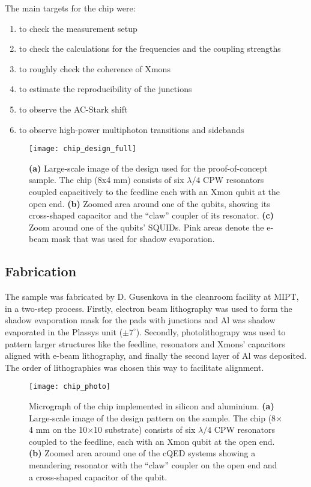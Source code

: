 \documentclass[12pt, twoside]{report}
\numberwithin{equation}{section}
\begin{document}
The main targets for the chip were:
\begin{enumerate}[label=(\alph*), leftmargin=1.5cm]
\itemsep0pt
 \item to check the measurement setup
 \item to check the calculations for the frequencies and the coupling strengths
 \item to roughly check the coherence of Xmons
 \item to estimate the reproducibility of the junctions 
 \item to observe the AC-Stark shift 
 \item to observe high-power multiphoton transitions and sidebands
\end{enumerate}

\begin{figure}[h!]
\centering
\texttt{[image: chip\_design\_full]}
\caption{\textbf{(a)} Large-scale image of the design used for the proof-of-concept sample. The chip (8x4 mm) consists of six $\lambda/4$ CPW resonators coupled capacitively to the feedline each with an Xmon qubit at the open end. \textbf{(b)} Zoomed area around one of the qubits, showing its cross-shaped capacitor and the ``claw'' coupler of its resonator. \textbf{(c)} Zoom around one of the qubits' SQUIDs. Pink areas denote the e-beam mask that was used for shadow evaporation.}
\label{fig:first_chip_design_full}
\end{figure}

\subsection{Fabrication}
The sample was fabricated by D. Gusenkova in the cleanroom facility at MIPT, in a two-step process. Firstly, electron beam lithography was used to form the shadow evaporation mask for the pads with junctions and Al was shadow evaporated in the Plassys unit ($\pm 7^\circ$). Secondly, photolithograpy was used to pattern larger structures like the feedline, resonators and Xmons' capacitors aligned with e-beam lithography, and finally the second layer of Al was deposited.	The order of lithographies was chosen this way to facilitate alignment.

\begin{figure}
\texttt{[image: chip\_photo]}
\caption{Micrograph of the chip implemented in silicon and aluminium. \textbf{(a)} Large-scale image of the design pattern on the sample. The chip (8$\times$4 mm on the 10$\times$10 substrate) consists of six $\lambda/4$ CPW resonators coupled to the feedline, each with an Xmon qubit at the open end. \textbf{(b)} Zoomed area around one of the cQED systems showing a meandering resonator with the ``claw'' coupler \cite{barends2013} on the open end and a cross-shaped capacitor of the qubit.}
\end{figure}
\end{document}
